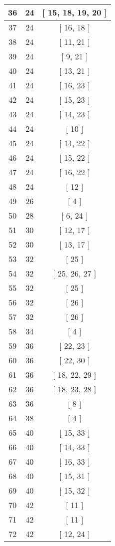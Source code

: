 \begin{center}
\begin{longtable}[H]{|| c c c ||}
\hline
36 & 24 & [ 15, 18, 19, 20 ] \\ 
\hline
37 & 24 & [ 16, 18 ] \\ 
\hline
38 & 24 & [ 11, 21 ] \\ 
\hline
39 & 24 & [ 9, 21 ] \\ 
\hline
40 & 24 & [ 13, 21 ] \\ 
\hline
41 & 24 & [ 16, 23 ] \\ 
\hline
42 & 24 & [ 15, 23 ] \\ 
\hline
43 & 24 & [ 14, 23 ] \\ 
\hline
44 & 24 & [ 10 ] \\ 
\hline
45 & 24 & [ 14, 22 ] \\ 
\hline
46 & 24 & [ 15, 22 ] \\ 
\hline
47 & 24 & [ 16, 22 ] \\ 
\hline
48 & 24 & [ 12 ] \\ 
\hline
49 & 26 & [ 4 ] \\ 
\hline
50 & 28 & [ 6, 24 ] \\ 
\hline
51 & 30 & [ 12, 17 ] \\ 
\hline
52 & 30 & [ 13, 17 ] \\ 
\hline
53 & 32 & [ 25 ] \\ 
\hline
54 & 32 & [ 25, 26, 27 ] \\ 
\hline
55 & 32 & [ 25 ] \\ 
\hline
56 & 32 & [ 26 ] \\ 
\hline
57 & 32 & [ 26 ] \\ 
\hline
58 & 34 & [ 4 ] \\ 
\hline
59 & 36 & [ 22, 23 ] \\ 
\hline
60 & 36 & [ 22, 30 ] \\ 
\hline
61 & 36 & [ 18, 22, 29 ] \\ 
\hline
62 & 36 & [ 18, 23, 28 ] \\ 
\hline
63 & 36 & [ 8 ] \\ 
\hline
64 & 38 & [ 4 ] \\ 
\hline
65 & 40 & [ 15, 33 ] \\ 
\hline
66 & 40 & [ 14, 33 ] \\ 
\hline
67 & 40 & [ 16, 33 ] \\ 
\hline
68 & 40 & [ 15, 31 ] \\ 
\hline
69 & 40 & [ 15, 32 ] \\ 
\hline
70 & 42 & [ 11 ] \\ 
\hline
71 & 42 & [ 11 ] \\ 
\hline
72 & 42 & [ 12, 24 ] \\ 

\end{longtable}
\end{center}
